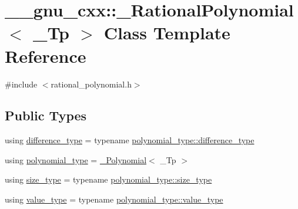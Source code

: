 \hypertarget{class____gnu__cxx_1_1__RationalPolynomial}{}\section{\+\_\+\+\_\+gnu\+\_\+cxx\+:\+:\+\_\+\+Rational\+Polynomial$<$ \+\_\+\+Tp $>$ Class Template Reference}
\label{class____gnu__cxx_1_1__RationalPolynomial}


{\ttfamily \#include $<$rational\+\_\+polynomial.\+h$>$}

\subsection*{Public Types}
\begin{DoxyCompactItemize}
\item 
using \hyperlink{class____gnu__cxx_1_1__RationalPolynomial_aa123f807ebadbf8b3948a77384ce8cb9}{difference\+\_\+type} = typename \hyperlink{class____gnu__cxx_1_1__Polynomial_a1b1f56c1951282267a0d18a420f53b80}{polynomial\+\_\+type\+::difference\+\_\+type}
\item 
using \hyperlink{class____gnu__cxx_1_1__RationalPolynomial_a96949c9007664fae9fef1e26cf6c2078}{polynomial\+\_\+type} = \hyperlink{class____gnu__cxx_1_1__Polynomial}{\+\_\+\+Polynomial}$<$ \+\_\+\+Tp $>$
\item 
using \hyperlink{class____gnu__cxx_1_1__RationalPolynomial_aaba2b07e6b5f33be46c30b5d0eac6da4}{size\+\_\+type} = typename \hyperlink{class____gnu__cxx_1_1__Polynomial_a8b25fcfd4acaad0c5c08b649c22da28a}{polynomial\+\_\+type\+::size\+\_\+type}
\item 
using \hyperlink{class____gnu__cxx_1_1__RationalPolynomial_adeec7f1bec03111031599f337848ee8b}{value\+\_\+type} = typename \hyperlink{class____gnu__cxx_1_1__Polynomial_a725563351f50e76084a7a016c06f8a53}{polynomial\+\_\+type\+::value\+\_\+type}
\end{DoxyCompactItemize}
